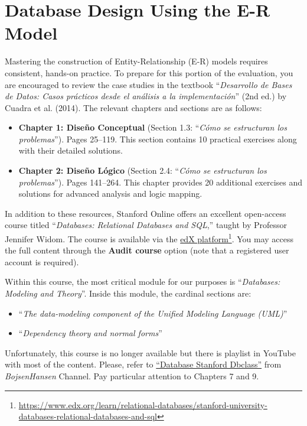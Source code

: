 \documentclass{article}
\begin{document}
\section{Database Design Using the E-R Model}

Mastering the construction of Entity-Relationship (E-R) models requires consistent, hands-on practice. To prepare for this portion of the evaluation, you are encouraged to review the case studies in the textbook ``\textit{Desarrollo de Bases de Datos: Casos prácticos desde el análisis a la implementación}'' (2nd ed.) by Cuadra et al. (2014). The relevant chapters and sections are as follows:

\begin{itemize}
    \item \textbf{Chapter 1: Diseño Conceptual} (Section 1.3: ``\textit{Cómo se estructuran los problemas}''). Pages 25--119. This section contains 10 practical exercises along with their detailed solutions.

    \item \textbf{Chapter 2: Diseño Lógico} (Section 2.4: ``\textit{Cómo se estructuran los problemas}''). Pages 141--264. This chapter provides 20 additional exercises and solutions for advanced analysis and logic mapping.
\end{itemize}

In addition to these resources, Stanford Online offers an excellent open-access course titled ``\textit{Databases: Relational Databases and SQL},'' taught by Professor Jennifer Widom. The course is available via the \href{https://www.edx.org/learn/relational-databases/stanford-university-databases-relational-databases-and-sql}{edX platform}\footnote{\url{https://www.edx.org/learn/relational-databases/stanford-university-databases-relational-databases-and-sql}}. You may access the full content through the \textbf{Audit course} option (note that a registered user account is required).

Within this course, the most critical module for our purposes is ``\textit{Databases: Modeling and Theory}''.  Inside this module, the cardinal sections are:

\begin{itemize}
    \item ``\textit{The data-modeling component of the Unified Modeling Language (UML)}''
    \item ``\textit{Dependency theory and normal forms}''
\end{itemize}

\begin{tcolorbox}[
    colback=yellow!10!white,
    colframe=yellow!70!black,
    title=Note
]
Unfortunately, this course is no longer available but there is playlist in YouTube with most of the content.  Please, refer to \href{https://www.youtube.com/playlist?list=PL6hGtHedy2Z4EkgY76QOcueU8lAC4o6c3}{``Database Stanford Dbclass''} from \textit{BojsenHansen} Channel.  Pay particular attention to Chapters 7 and 9.
\end{tcolorbox}
\end{document}
